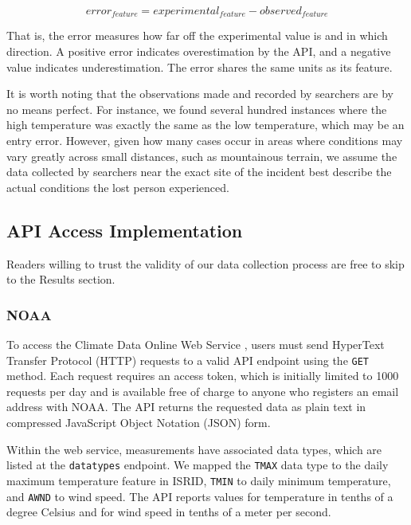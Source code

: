 \documentclass[12pt]{article}
\begin{document}
      \[error_{feature} = experimental_{feature} - observed_{feature}\]

      That is, the error measures how far off the experimental value is and in
      which direction. A positive error indicates overestimation by the API,
      and a negative value indicates underestimation. The error shares the same
      units as its feature.

      It is worth noting that the observations made and recorded by searchers
      are by no means perfect. For instance, we found several hundred instances
      where the high temperature was exactly the same as the low temperature,
      which may be an entry error. However, given how many cases occur in areas
      where conditions may vary greatly across small distances, such as
      mountainous terrain, we assume the data collected by searchers near the
      exact site of the incident best describe the actual conditions the lost
      person experienced.

    \subsection{API Access Implementation}
      Readers willing to trust the validity of our data collection process are
      free to skip to the Results section.

      \subsubsection{NOAA}
        To access the Climate Data Online Web Service \cite{noaa}, users must
        send HyperText Transfer Protocol (HTTP) requests to a valid API
        endpoint using the \texttt{GET} method. Each request requires an access
        token, which is initially limited to 1000 requests per day and is
        available free of charge to anyone who registers an email address with
        NOAA. The API returns the requested data as plain text in compressed
        JavaScript Object Notation (JSON) form.

        Within the web service, measurements have associated data types, which
        are listed at the \texttt{datatypes} endpoint. We mapped the
        \texttt{TMAX} data type to the daily maximum temperature feature in
        ISRID, \texttt{TMIN} to daily minimum temperature, and \texttt{AWND} to
        wind speed. The API reports values for temperature in tenths of a
        degree Celsius and for wind speed in tenths of a meter per second.
\end{document}
